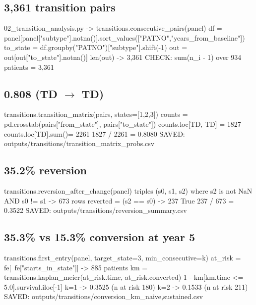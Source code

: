 \documentclass[11pt,a4paper]{article}
\begin{document}
\subsection*{3{,}361 transition pairs}
\begin{codeblock}
02_transition_analysis.py -> transitions.consecutive_pairs(panel)
  df = panel[panel["subtype"].notna()].sort_values(["PATNO","years_from_baseline"])
  to_state = df.groupby("PATNO")["subtype"].shift(-1)
  out = out[out["to_state"].notna()]
  len(out) -> 3,361      CHECK: sum(n_i - 1) over 934 patients = 3,361
\end{codeblock}

\subsection*{0.808 (TD $\rightarrow$ TD)}
\begin{codeblock}
transitions.transition_matrix(pairs, states=[1,2,3])
  counts = pd.crosstab(pairs["from_state"], pairs["to_state"])
  counts.loc[TD, TD]  = 1827
  counts.loc[TD].sum()= 2261
  1827 / 2261 = 0.8080
  SAVED: outputs/transitions/transition_matrix_probs.csv
\end{codeblock}

\subsection*{35.2\% reversion}
\begin{codeblock}
transitions.reversion_after_change(panel)
  triples (s0, s1, s2) where s2 is not NaN AND s0 != s1     -> 673 rows
  reverted = (s2 == s0)                                     -> 237 True
  237 / 673 = 0.3522
  SAVED: outputs/transitions/reversion_summary.csv
\end{codeblock}

\subsection*{35.3\% vs 15.3\% conversion at year 5}
\begin{codeblock}
transitions.first_entry(panel, target_state=3, min_consecutive=k)
  at_risk = fe[~fe["starts_in_state"]]                      -> 885 patients
  km = transitions.kaplan_meier(at_risk.time, at_risk.converted)
  1 - km[km.time <= 5.0].survival.iloc[-1]
      k=1 -> 0.3525   (n at risk 180)
      k=2 -> 0.1533   (n at risk 211)
  SAVED: outputs/transitions/conversion_km_{naive,sustained}.csv
\end{codeblock}
\end{document}
